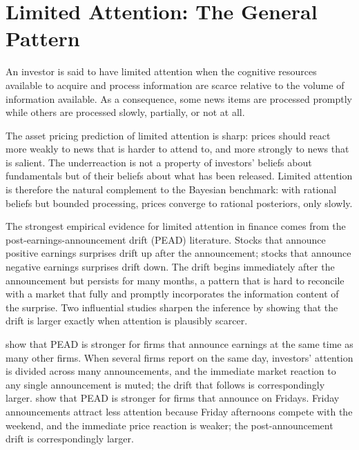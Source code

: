 \section{Limited Attention: The General Pattern}
\label{sec:att1}

\begin{definition}
\label{def:limitedatt}
An investor is said to have limited attention when the cognitive resources available to acquire and process information are scarce relative to the volume of information available. As a consequence, some news items are processed promptly while others are processed slowly, partially, or not at all.
\end{definition}

The asset pricing prediction of limited attention is sharp: prices should react more weakly to news that is harder to attend to, and more strongly to news that is salient. The underreaction is not a property of investors' beliefs about fundamentals but of their beliefs about what has been released. Limited attention is therefore the natural complement to the Bayesian benchmark: with rational beliefs but bounded processing, prices converge to rational posteriors, only slowly.

The strongest empirical evidence for limited attention in finance comes from the post-earnings-announcement drift (PEAD) literature. Stocks that announce positive earnings surprises drift up after the announcement; stocks that announce negative earnings surprises drift down. The drift begins immediately after the announcement but persists for many months, a pattern that is hard to reconcile with a market that fully and promptly incorporates the information content of the surprise. Two influential studies sharpen the inference by showing that the drift is larger exactly when attention is plausibly scarcer.

\citet{hirshleifer2009} show that PEAD is stronger for firms that announce earnings at the same time as many other firms. When several firms report on the same day, investors' attention is divided across many announcements, and the immediate market reaction to any single announcement is muted; the drift that follows is correspondingly larger. \citet{dellavigna2009} show that PEAD is stronger for firms that announce on Fridays. Friday announcements attract less attention because Friday afternoons compete with the weekend, and the immediate price reaction is weaker; the post-announcement drift is correspondingly larger.

